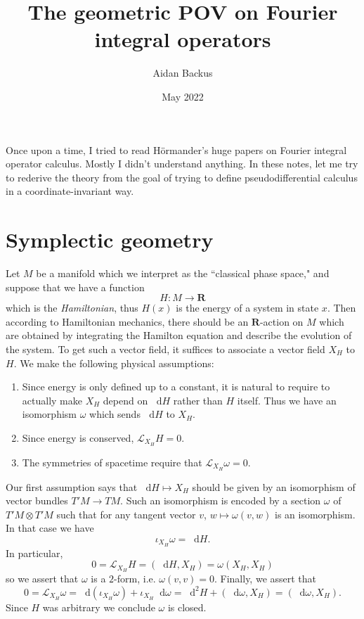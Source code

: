 \documentclass[reqno,12pt,letterpaper]{amsart}
\title[Geometric FIOs]{The geometric POV on Fourier integral operators}
\author{Aidan Backus}
\date{May 2022}
\newcommand{\RR}{\mathbf{R}}
\newcommand*\dif{\mathop{}\!\mathrm{d}}
\newcommand{\dfn}[1]{\emph{#1}\index{#1}}
\theoremstyle{definition}
\numberwithin{equation}{section}
\begin{document}
\maketitle



Once upon a time, I tried to read H\"ormander's huge papers on Fourier integral operator calculus.
Mostly I didn't understand anything.
In these notes, let me try to rederive the theory from the goal of trying to define pseudodifferential calculus in a coordinate-invariant way.

\section{Symplectic geometry}
Let $M$ be a manifold which we interpret as the ``classical phase space," and suppose that we have a function 
$$H: M \to \RR$$
which is the \dfn{Hamiltonian}, thus $H(x)$ is the energy of a system in state $x$.
Then according to Hamiltonian mechanics, there should be an $\RR$-action on $M$ which are obtained by integrating the Hamilton equation and describe the evolution of the system.
To get such a vector field, it suffices to associate a vector field $X_H$ to $H$. We make the following physical assumptions:
\begin{enumerate}
\item Since energy is only defined up to a constant, it is natural to require to actually make $X_H$ depend on $\dif H$ rather than $H$ itself. Thus we have an isomorphism $\omega$ which sends $\dif H$ to $X_H$.
\item Since energy is conserved, $\mathcal L_{X_H} H = 0$.
\item The symmetries of spacetime require that $\mathcal L_{X_H} \omega = 0$.
\end{enumerate}
Our first assumption says that $\dif H \mapsto X_H$ should be given by an isomorphism of vector bundles $T'M \to TM$.
Such an isomorphism is encoded by a section $\omega$ of $T'M \otimes T'M$ such that for any tangent vector $v$, $w \mapsto \omega(v, w)$ is an isomorphism.
In that case we have
$$\iota_{X_H} \omega = \dif H.$$
In particular, 
$$0 = \mathcal L_{X_H} H =  (\dif H, X_H) = \omega(X_H, X_H)$$
so we assert that $\omega$ is a $2$-form, i.e. $\omega(v, v) = 0$.
Finally, we assert that 
$$0 = \mathcal L_{X_H} \omega = \dif (\iota_{X_H} \omega) + \iota_{X_H} \dif \omega = \dif^2 H + (\dif \omega, X_H) = (\dif \omega, X_H).$$
Since $H$ was arbitrary we conclude $\omega$ is closed.
\end{document}
